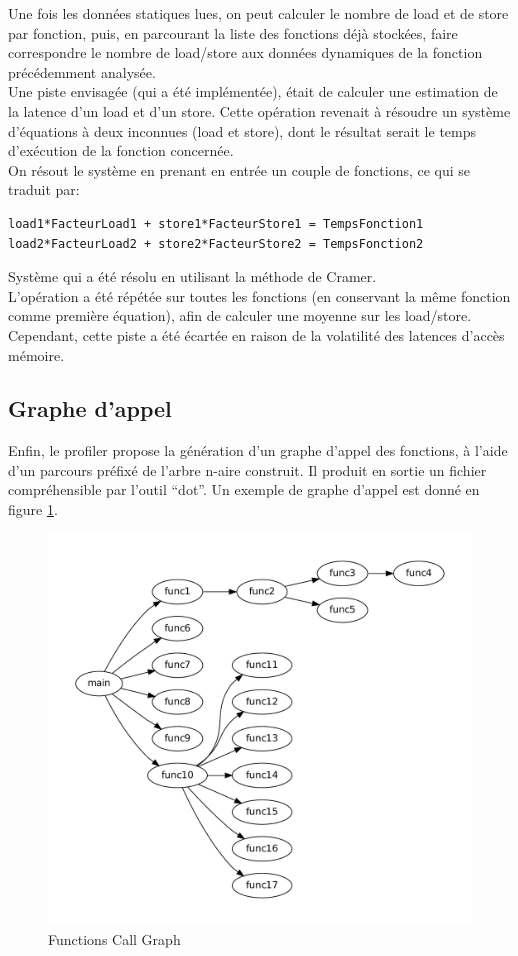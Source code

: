 Une fois les données statiques lues, on peut calculer le nombre de load et de store par fonction, puis, en parcourant la liste des fonctions déjà stockées, faire correspondre le nombre de load/store aux données dynamiques de la fonction précédemment analysée.\\

Une piste envisagée (qui a été implémentée), était de calculer une estimation de la latence d'un load et d'un store. Cette opération revenait à résoudre un système d'équations à deux inconnues (load et store), dont le résultat serait le temps d'exécution de la fonction concernée.\\
On résout le système en prenant en entrée un couple de fonctions, ce qui se traduit par:
\begin{verbatim}
load1*FacteurLoad1 + store1*FacteurStore1 = TempsFonction1
load2*FacteurLoad2 + store2*FacteurStore2 = TempsFonction2
\end{verbatim}
Système qui a été résolu en utilisant la méthode de Cramer.\\

L'opération a été répétée sur toutes les fonctions (en conservant la même fonction comme première équation), afin de calculer une moyenne sur les load/store.
Cependant, cette piste a été écartée en raison de la volatilité des latences d'accès mémoire.\\

\subsection{Graphe d'appel}

Enfin, le profiler propose la génération d'un graphe d'appel des fonctions, à l'aide d'un parcours préfixé de l'arbre n-aire construit. Il produit en sortie un fichier compréhensible par l'outil ``dot''. Un exemple de graphe d'appel est donné en figure \ref{fig:call_graph}.

\begin{figure}[here]
  \includegraphics[scale=0.50]{images/CallGraph}
  \caption{Functions Call Graph}
  \label{fig:call_graph}
\end{figure}
